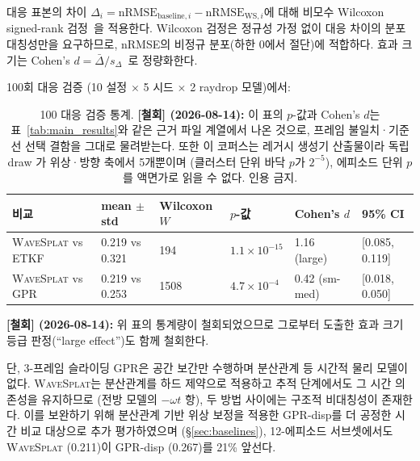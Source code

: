 \documentclass[11pt]{report}
\numberwithin{equation}{chapter}
\numberwithin{figure}{chapter}
\numberwithin{table}{chapter}
\newcommand{\WS}{\textsc{WaveSplat}}
\begin{document}
대응 표본의 차이 $\Delta_i = \text{nRMSE}_{\text{baseline},i} - \text{nRMSE}_{\text{WS},i}$에 대해
비모수 Wilcoxon signed-rank 검정~\citep{Wilcoxon1945}을 적용한다.
Wilcoxon 검정은 정규성 가정 없이 대응 차이의 분포 대칭성만을 요구하므로,
nRMSE의 비정규 분포(하한 0에서 절단)에 적합하다.
효과 크기는 Cohen's $d = \bar{\Delta} / s_\Delta$~\citep{Cohen1988}로 정량화한다.

100회 대응 검증 (10 설정 $\times$ 5 시드 $\times$ 2 raydrop 모델)에서:

\begin{table}[htbp]
\centering
\caption{100 대응 검증 통계.
\textbf{[철회] (2026-08-14):} 이 표의 $p$-값과 Cohen's $d$는 표~\ref{tab:main_results}와
같은 근거 파일 계열에서 나온 것으로, 프레임 불일치·기준선 선택 결함을 그대로 물려받는다.
또한 이 코퍼스는 레거시 생성기 산출물이라 독립 draw 가 위상·방향 축에서 5개뿐이며
(클러스터 단위 바닥 $p$가 $2^{-5}$), 에피소드 단위 $p$를 액면가로 읽을 수 없다. 인용 금지.}
\label{tab:stats}
\footnotesize
\begin{tabular}{llllll}
\toprule
비교 & mean $\pm$ std & Wilcoxon $W$ & $p$-값 & Cohen's $d$ & 95\% CI \\
\midrule
\WS{} vs ETKF & 0.219 vs 0.321 & 194 & $1.1\times10^{-15}$ & 1.16 (large) & [0.085, 0.119] \\
\WS{} vs GPR & 0.219 vs 0.253 & 1508 & $4.7\times10^{-4}$ & 0.42 (sm-med) & [0.018, 0.050] \\
\bottomrule
\end{tabular}
\end{table}

\textbf{[철회] (2026-08-14):} 위 표의 통계량이 철회되었으므로 그로부터 도출한
효과 크기 등급 판정(``large effect'')도 함께 철회한다.

단, 3-프레임 슬라이딩 GPR은 공간 보간만 수행하며 분산관계 등 시간적 물리 모델이 없다.
\WS{}는 분산관계를 하드 제약으로 적용하고 추적 단계에서도 그 시간 의존성을 유지하므로
(전방 모델의 $-\omega t$ 항), 두 방법 사이에는
구조적 비대칭성이 존재한다. 이를 보완하기 위해 분산관계 기반 위상 보정을 적용한
GPR-disp를 더 공정한 시간 비교 대상으로 추가 평가하였으며
(\S\ref{sec:baselines}), 12-에피소드 서브셋에서도
\WS{} (0.211)이 GPR-disp (0.267)를 21\% 앞선다.
\end{document}
